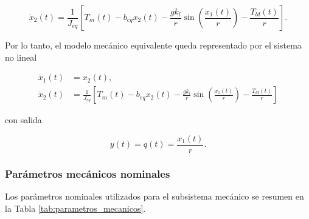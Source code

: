 \documentclass[10pt,a4paper]{article}
\begin{document}
\begin{equation}
    \dot{x}_2(t)
    =
    \frac{1}{J_{eq}}
    \left[
    T_m(t)
    -
    b_{eq}x_2(t)
    -
    \frac{g k_l}{r}
    \sin\left(
    \frac{x_1(t)}{r}
    \right)
    -
    \frac{T_{ld}(t)}{r}
    \right].
    \label{eq:x2_mecanico}
\end{equation}

Por lo tanto, el modelo mecánico equivalente queda representado por el sistema no lineal

\begin{equation}
    \boxed{
    \begin{aligned}
        \dot{x}_1(t)
        &=
        x_2(t),
        \\
        \dot{x}_2(t)
        &=
        \frac{1}{J_{eq}}
        \left[
        T_m(t)
        -
        b_{eq}x_2(t)
        -
        \frac{g k_l}{r}
        \sin\left(
        \frac{x_1(t)}{r}
        \right)
        -
        \frac{T_{ld}(t)}{r}
        \right]
    \end{aligned}
    }
    \label{eq:ss_mecanico}
\end{equation}

con salida

\begin{equation}
    y(t)
    =
    q(t)
    =
    \frac{x_1(t)}{r}.
    \label{eq:salida_ss_mecanico}
\end{equation}

\subsubsection{Parámetros mecánicos nominales}

Los parámetros nominales utilizados para el subsistema mecánico se resumen en la Tabla \ref{tab:parametros_mecanicos}.
\end{document}
